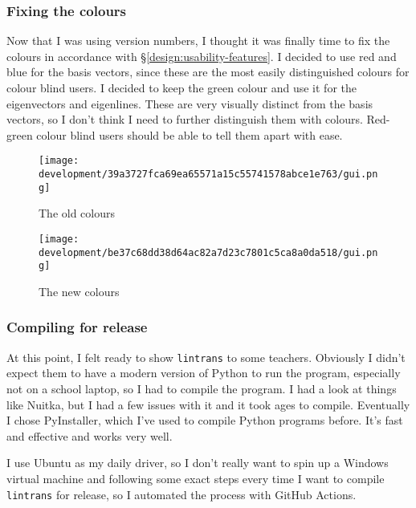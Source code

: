 \documentclass[../development.tex]{subfiles}
\begin{document}
\subsubsection{Fixing the colours\label{development:fumbling-with-semver:fixing-the-colours}}

Now that I was using version numbers, I thought it was finally time to fix the colours in accordance with \S\ref{design:usability-features}. I decided to use red and blue for the basis vectors, since these are the most easily distinguished colours for colour blind users. I decided to keep the green colour and use it for the eigenvectors and eigenlines. These are very visually distinct from the basis vectors, so I don't think I need to further distinguish them with colours. Red-green colour blind users should be able to tell them apart with ease.

\begin{figure}[H]
	\centering
	\texttt{[image: development/39a3727fca69ea65571a15c55741578abce1e763/gui.png]}
	\caption{The old colours}
	\label{fig:development:39a3727fca69ea65571a15c55741578abce1e763:gui.png}
\end{figure}

\begin{figure}[H]
	\centering
	\texttt{[image: development/be37c68dd38d64ac82a7d23c7801c5ca8a0da518/gui.png]}
	\caption{The new colours}
	\label{fig:development:be37c68dd38d64ac82a7d23c7801c5ca8a0da518:gui.png}
\end{figure}

\subsubsection{Compiling for release\label{development:fumbling-with-semver:compiling-for-release}}

At this point, I felt ready to show \texttt{lintrans} to some teachers. Obviously I didn't expect them to have a modern version of Python to run the program, especially not on a school laptop, so I had to compile the program. I had a look at things like Nuitka\cite{nuitka-docs}, but I had a few issues with it and it took ages to compile. Eventually I chose PyInstaller\cite{pyinstaller-4.10-docs}, which I've used to compile Python programs before. It's fast and effective and works very well.

I use Ubuntu as my daily driver, so I don't really want to spin up a Windows virtual machine and following some exact steps every time I want to compile \texttt{lintrans} for release, so I automated the process with GitHub Actions.
\end{document}
